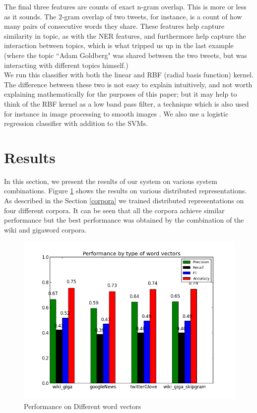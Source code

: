 \documentclass[conference]{IEEEtran}
\begin{document}
\indent The final three features are counts of exact n-gram overlap.  This is more or less as it sounds.  The 2-gram overlap of two tweets, for instance, is a count of how many pairs of consecutive words they share.  These features help capture similarity in topic, as with the NER features, and furthermore help capture the interaction between topics, which is what tripped us up in the last example (where the topic ``Adam Goldberg" was shared between the two tweets, but was interacting with different topics himself.) \\

\indent We run this classifier with both the linear and RBF (radial basis function) kernel.  The difference between these two is not easy to explain intuitively, and not worth explaining mathematically for the purposes of this paper; but it may help to think of the RBF kernel as a low band pass filter, a technique which is also used for instance in image processing to smooth images \cite{RBF}. We also use a logistic regression classifier with addition to the SVMs.\\

\section{Results}
In this section, we present the results of our system on various system combinations. Figure \ref{vectorSelect} shows the results on various distributed representations. As described in the Section \ref{corpora} we trained distributed representations on four different corpora. It can be seen that all the corpora achieve similar performance but the best performance was obtained by the combination of the wiki and gigaword corpora.\\
\begin{figure}
	\centering
	\includegraphics[scale=0.4]{cmp_vecs.png}
	\caption{Performance on Different word vectors}
	\label{vectorSelect}
\end{figure}
\end{document}
